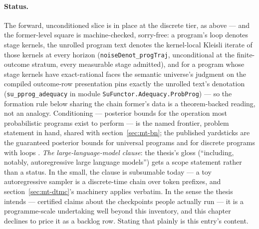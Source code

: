 \paragraph{Status.} The forward, unconditioned slice is in place at
the discrete tier, as above --- and the former-level square is
machine-checked, sorry-free: a program's loop denotes stage kernels,
the unrolled program text denotes the kernel-local Kleisli iterate of
those kernels at every horizon (\texttt{noiseDenot\_progTraj},
unconditional at the finite-outcome stratum, every measurable stage
admitted), and for a program whose stage kernels have exact-rational
faces the semantic universe's judgment on the compiled outcome-row
presentation pins exactly the unrolled text's denotation
(\texttt{su\_pprog\_adequacy} in module
\texttt{SuFunctor.Adequacy.ProbProg}) --- so the formation rule
below sharing the chain former's data is a theorem-backed reading,
not an analogy. Conditioning --- posterior bounds for
the operation most probabilistic programs exist to perform --- is
the named frontier, problem statement in hand, shared with
section~\ref{sec:mt-bn}; the published yardsticks are the guaranteed
posterior bounds for universal programs \cite{beutner22} and for
discrete programs with loops \cite{zaiser24}. \emph{The large-language-model clause}: the
thesis's gloss (``including, notably, autoregressive large language
models'') gets a scope statement rather than a status. In the small,
the clause is subsumable today --- a toy autoregressive sampler is a
discrete-time chain over token prefixes, and
section~\ref{sec:mt-dtmc}'s machinery applies verbatim. In the sense
the thesis intends --- certified claims about the checkpoints people
actually run --- it is a programme-scale undertaking well beyond
this inventory, and this chapter declines to price it as a backlog
row. Stating that plainly is this entry's content.



